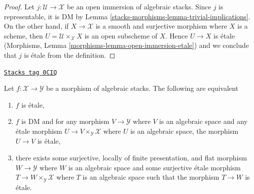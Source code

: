 \begin{proof}
Let $j : \mathcal{U} \to \mathcal{X}$ be an open immersion of
algebraic stacks. Since $j$ is representable, it is DM by
Lemma \ref{stacks-morphisms-lemma-trivial-implications}. On the other hand,
if $X \to \mathcal{X}$ is a smooth and surjective morphism
where $X$ is a scheme, then $U = \mathcal{U} \times_\mathcal{X} X$
is an open subscheme of $X$. Hence $U \to X$ is \'etale
(Morphisms, Lemma \ref{morphisms-lemma-open-immersion-etale})
and we conclude that $j$ is \'etale from the definition.
\end{proof}

\begin{lemma}[Etale]
\label{stacks-morphisms-lemma-etale}
\href{https://stacks.math.columbia.edu/tag/0CIQ}{\texttt{Stacks tag 0CIQ}}

Let $f : \mathcal{X} \to \mathcal{Y}$ be a morphism of algebraic stacks.
The following are equivalent
\begin{enumerate}
\item $f$ is \'etale,
\item $f$ is DM and for any morphism $V \to \mathcal{Y}$
where $V$ is an algebraic space and any \'etale morphism
$U \to V \times_\mathcal{Y} \mathcal{X}$ where $U$ is an algebraic space,
the morphism $U \to V$ is \'etale,
\item there exists some surjective, locally of finite presentation, and flat
morphism $W \to \mathcal{Y}$ where $W$ is an algebraic space and some
surjective \'etale morphism $T \to W \times_\mathcal{Y} \mathcal{X}$
where $T$ is an algebraic space such that the morphism $T \to W$ is \'etale.
\end{enumerate}
\end{lemma}

